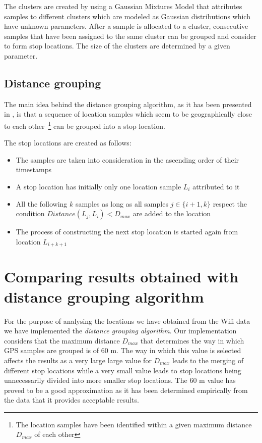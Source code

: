 The clusters are created by using a Gaussian Mixtures Model that attributes
samples to different clusters which are modeled as Gaussian distributions which
have unknown parameters. After a sample is allocated to a cluster, consecutive
samples that have been assigned to the same cluster can be grouped and consider
to form stop locations. The size of the clusters are determined by a given
parameter.
 
\subsection{Distance grouping}

The main idea behind the distance grouping algorithm, as it has been presented
in \cite{cuttone2014inferring}, is that a sequence of location samples which
seem to be geographically close to each other~\footnote{The location samples have
been identified within a given maximum distance $D_{max}$ of each other} can be
grouped into a stop location.

The stop locations are created as follows:
\begin{itemize}
  \item The samples are taken into consideration in the ascending order of their
  timestamps
  \item A stop location has initially only one location sample $L_{i}$
  attributed to it
  \item All the following $k$ samples as long as all samples $j \in \{i+1, k\}$
  respect the condition $Distance(L_{j}, L_{i}) < D_{max}$ are added to the
  location
  \item The process of constructing the next stop location is started again from
  location $L_{i+k+1}$
\end{itemize}

\section{Comparing results obtained with distance grouping algorithm}

For the purpose of analysing the locations we have obtained from the Wifi data
we have implemented the \textit{distance grouping algorithm}. Our implementation
considers that the maximum distance $D_{max}$ that determines the way in which
GPS samples are grouped is of $60$ m. The way in which this value is selected
affects the results as a very large large value for $D_{max}$ leads to the
merging of different stop locations while a very small value leads to stop
locations being unnecessarily divided into more smaller stop locations. The $60$
m value has proved to be a good approximation as it has been determined
empirically from the data that it provides acceptable results.

